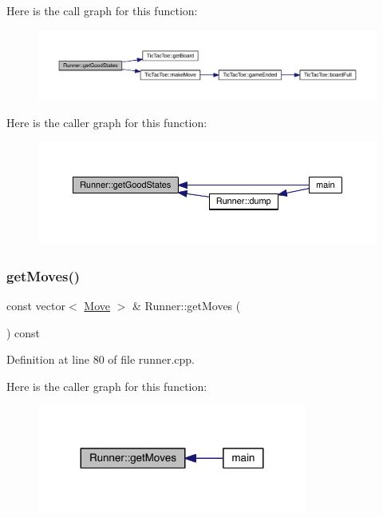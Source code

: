 Here is the call graph for this function\+:\nopagebreak
\begin{figure}[H]
\begin{center}
\leavevmode
\includegraphics[width=350pt]{class_runner_a2d1297463b5825f5afa1e3e502919698_cgraph}
\end{center}
\end{figure}
Here is the caller graph for this function\+:\nopagebreak
\begin{figure}[H]
\begin{center}
\leavevmode
\includegraphics[width=350pt]{class_runner_a2d1297463b5825f5afa1e3e502919698_icgraph}
\end{center}
\end{figure}
\mbox{\label{class_runner_aebd1690762a996fbad5aa1b56d3aacc0}} 
\subsubsection{\texorpdfstring{get\+Moves()}{getMoves()}}
{\footnotesize\ttfamily const vector$<$ \hyperlink{struct_move}{Move} $>$ \& Runner\+::get\+Moves (\begin{DoxyParamCaption}{ }\end{DoxyParamCaption}) const}



Definition at line 80 of file runner.\+cpp.

Here is the caller graph for this function\+:\nopagebreak
\begin{figure}[H]
\begin{center}
\leavevmode
\includegraphics[width=251pt]{class_runner_aebd1690762a996fbad5aa1b56d3aacc0_icgraph}
\end{center}
\end{figure}
\mbox{\label{class_runner_aa4e55d3ecb77ffc83dfde5dc1fc3663b}} 
